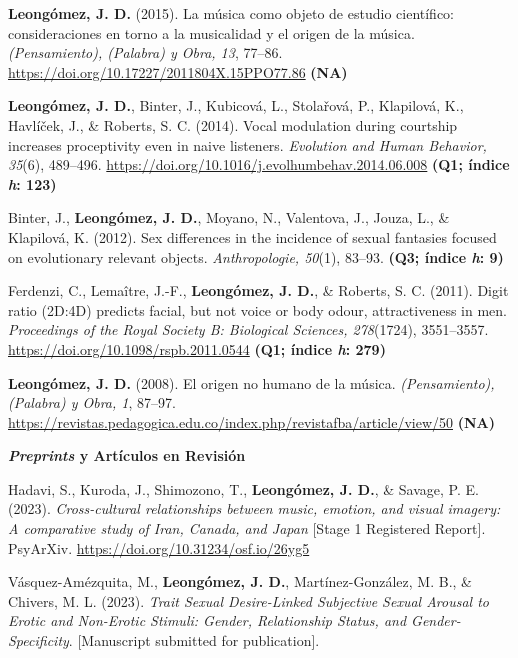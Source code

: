 \documentclass[11pt,a4paper,]{awesome-cv}
\begin{document}
\textbf{Leongómez, J. D.} (2015). La música como objeto de estudio
científico: consideraciones en torno a la musicalidad y el origen de la
música. \emph{(Pensamiento), (Palabra) y Obra, 13}, 77--86.
\url{https://doi.org/10.17227/2011804X.15PPO77.86} \textbf{(NA)}

\textbf{Leongómez, J. D.}, Binter, J., Kubicová, L., Stolařová, P.,
Klapilová, K., Havlíček, J., \& Roberts, S. C. (2014). Vocal modulation
during courtship increases proceptivity even in naive listeners.
\emph{Evolution and Human Behavior, 35}(6), 489--496.
\url{https://doi.org/10.1016/j.evolhumbehav.2014.06.008} \textbf{(Q1;
índice \emph{h}: 123)}

Binter, J., \textbf{Leongómez, J. D.}, Moyano, N., Valentova, J., Jouza,
L., \& Klapilová, K. (2012). Sex differences in the incidence of sexual
fantasies focused on evolutionary relevant objects. \emph{Anthropologie,
50}(1), 83--93. \textbf{(Q3; índice \emph{h}: 9)}

Ferdenzi, C., Lemaître, J.-F., \textbf{Leongómez, J. D.}, \& Roberts, S.
C. (2011). Digit ratio (2D:4D) predicts facial, but not voice or body
odour, attractiveness in men. \emph{Proceedings of the Royal Society B:
Biological Sciences, 278}(1724), 3551--3557.
\url{https://doi.org/10.1098/rspb.2011.0544} \textbf{(Q1; índice
\emph{h}: 279)}

\textbf{Leongómez, J. D.} (2008). El origen no humano de la música.
\emph{(Pensamiento), (Palabra) y Obra, 1}, 87--97.
\url{https://revistas.pedagogica.edu.co/index.php/revistafba/article/view/50}
\textbf{(NA)}

\endgroup

\blacktriangleright\blacktriangleright\blacktriangleright\space \textbf{\textit{Preprints} y Artículos en Revisión}

\begingroup
\footnotesize
\setlength{\parindent}{-0.5in}
\setlength{\leftskip}{0.5in}

Hadavi, S., Kuroda, J., Shimozono, T., \textbf{Leongómez, J. D.}, \&
Savage, P. E. (2023). \emph{Cross-cultural relationships between music,
emotion, and visual imagery: A comparative study of Iran, Canada, and
Japan} {[}Stage 1 Registered Report{]}. PsyArXiv.
\url{https://doi.org/10.31234/osf.io/26yg5}

Vásquez-Amézquita, M., \textbf{Leongómez, J. D.}, Martínez-González, M.
B., \& Chivers, M. L. (2023). \emph{Trait Sexual Desire-Linked
Subjective Sexual Arousal to Erotic and Non-Erotic Stimuli: Gender,
Relationship Status, and Gender-Specificity}. {[}Manuscript submitted
for publication{]}.
\end{document}
